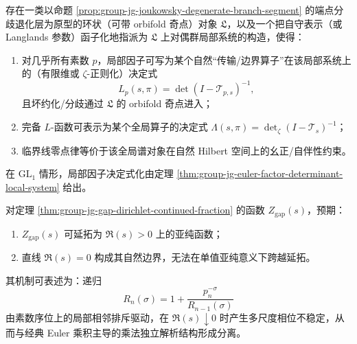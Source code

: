 \begin{conjecture}\label{conj:group-jg-singular-loop-determinant-langlands}
存在一类以命题 \ref{prop:group-jg-joukowsky-degenerate-branch-segment} 的端点分歧退化层为原型的环状（可带 orbifold 奇点）对象 \(\mathfrak L\)，以及一个把自守表示（或 Langlands 参数）函子化地指派为 \(\mathfrak L\) 上对偶群局部系统的构造，使得：
\begin{enumerate}
  \item 对几乎所有素数 \(p\)，局部因子可写为某个自然“传输/边界算子”在该局部系统上的（有限维或 \(\zeta\)-正则化）决定式
  \[
  L_p(s,\pi)=\det(I-\mathcal T_{p,s})^{-1},
  \]
  且坏约化/分歧通过 \(\mathfrak L\) 的 orbifold 奇点进入；
  \item 完备 \(L\)-函数可表示为某个全局算子的决定式
  \(
  \Lambda(s,\pi)=\det_{\zeta}(I-\mathcal T_s)^{-1}
  \)；
  \item 临界线零点律等价于该全局谱对象在自然 Hilbert 空间上的幺正/自伴性约束。
\end{enumerate}
在 \(\mathrm{GL}_1\) 情形，局部因子决定式化由定理 \ref{thm:group-jg-euler-factor-determinant-local-system} 给出。
\end{conjecture}

\begin{conjecture}\label{conj:group-jg-gap-zeta-natural-boundary}
对定理 \ref{thm:group-jg-gap-dirichlet-continued-fraction} 的函数 \(Z_{\mathrm{gap}}(s)\)，预期：
\begin{enumerate}
  \item \(Z_{\mathrm{gap}}(s)\) 可延拓为 \(\Re(s)>0\) 上的亚纯函数；
  \item 直线 \(\Re(s)=0\) 构成其自然边界，无法在单值亚纯意义下跨越延拓。
\end{enumerate}
其机制可表述为：递归
\[
R_n(\sigma)=1+\frac{p_n^{-\sigma}}{R_{n-1}(\sigma)}
\]
由素数序位上的局部相邻排斥驱动，在 \(\Re(s)\downarrow 0\) 时产生多尺度相位不稳定，从而与经典 Euler 乘积主导的乘法独立解析结构形成分离。
\end{conjecture}
